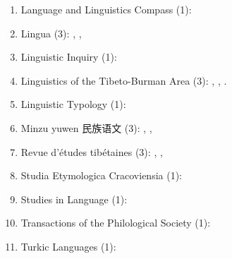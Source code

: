 \documentclass[oldfontcommands,oneside,a4paper,11pt]{article}
\newcommand{\zh}[1]{{\cn #1}}
\begin{document}
\begin{enumerate}
   \item  Language and Linguistics Compass (1): \citet{jacques14inverse}   
 \item Lingua (3):  \citet{jacques11lingua}, \citet{jacques12incorp}, \citet{jacques14antipassive}
 \item Linguistic Inquiry (1): \citet{antonov14need}
 \item Linguistics of the Tibeto-Burman Area (3): \citet{jacques09wazur}, \citet{jacques13tropative}, \citet{jacques14linking}.
 \item Linguistic Typology (1): \citet{jacques13harmonization}
 \item Minzu yuwen \zh{民族语文} (3): \citet{jacques03s.houzhui}, \citet{jacques04redupl}, \citet{jacques08weiyu}
 \item Revue d'études tibétaines (3): \citet{jacques07naksatram},  \citet{jacques08debther},   \citet{jacques10ndr}
 \item Studia Etymologica Cracoviensia (1):  \citet{jacques13vama}
  \item Studies in Language (1): \citet{jacques14auditory}
  \item Transactions of the Philological Society (1):  \citet{jacques12internal}
  \item Turkic Languages (1): \citet{antonov12kumush}
 \end{enumerate} 
 
\end{document}
